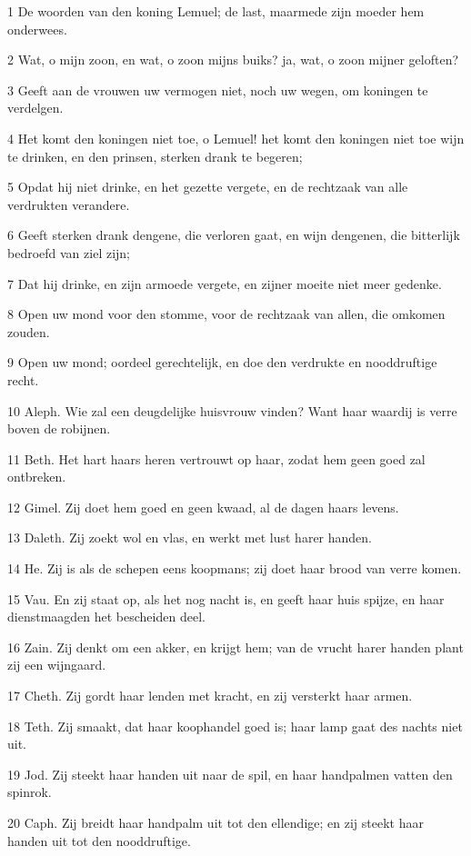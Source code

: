 \par 1 De woorden van den koning Lemuel; de last, maarmede zijn moeder hem onderwees.
\par 2 Wat, o mijn zoon, en wat, o zoon mijns buiks? ja, wat, o zoon mijner geloften?
\par 3 Geeft aan de vrouwen uw vermogen niet, noch uw wegen, om koningen te verdelgen.
\par 4 Het komt den koningen niet toe, o Lemuel! het komt den koningen niet toe wijn te drinken, en den prinsen, sterken drank te begeren;
\par 5 Opdat hij niet drinke, en het gezette vergete, en de rechtzaak van alle verdrukten verandere.
\par 6 Geeft sterken drank dengene, die verloren gaat, en wijn dengenen, die bitterlijk bedroefd van ziel zijn;
\par 7 Dat hij drinke, en zijn armoede vergete, en zijner moeite niet meer gedenke.
\par 8 Open uw mond voor den stomme, voor de rechtzaak van allen, die omkomen zouden.
\par 9 Open uw mond; oordeel gerechtelijk, en doe den verdrukte en nooddruftige recht.
\par 10 Aleph. Wie zal een deugdelijke huisvrouw vinden? Want haar waardij is verre boven de robijnen.
\par 11 Beth. Het hart haars heren vertrouwt op haar, zodat hem geen goed zal ontbreken.
\par 12 Gimel. Zij doet hem goed en geen kwaad, al de dagen haars levens.
\par 13 Daleth. Zij zoekt wol en vlas, en werkt met lust harer handen.
\par 14 He. Zij is als de schepen eens koopmans; zij doet haar brood van verre komen.
\par 15 Vau. En zij staat op, als het nog nacht is, en geeft haar huis spijze, en haar dienstmaagden het bescheiden deel.
\par 16 Zain. Zij denkt om een akker, en krijgt hem; van de vrucht harer handen plant zij een wijngaard.
\par 17 Cheth. Zij gordt haar lenden met kracht, en zij versterkt haar armen.
\par 18 Teth. Zij smaakt, dat haar koophandel goed is; haar lamp gaat des nachts niet uit.
\par 19 Jod. Zij steekt haar handen uit naar de spil, en haar handpalmen vatten den spinrok.
\par 20 Caph. Zij breidt haar handpalm uit tot den ellendige; en zij steekt haar handen uit tot den nooddruftige.
